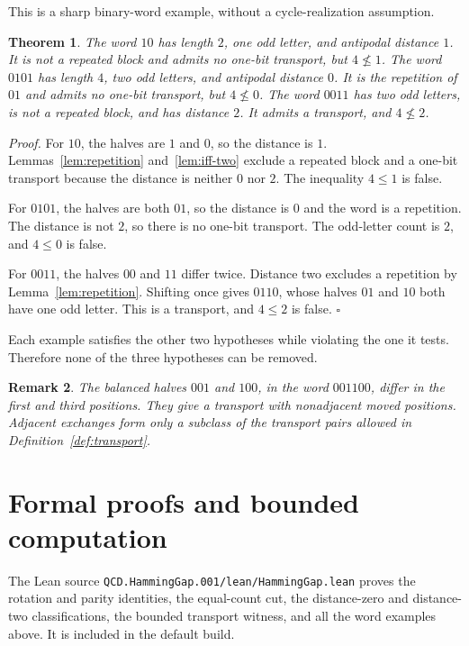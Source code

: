 \documentclass[11pt,letterpaper]{article}
\newtheorem{theorem}{Theorem}
\newtheorem{remark}[theorem]{Remark}
\newenvironment{proof}{\noindent\textit{Proof.}}{\hfill\(\square\)}
\begin{document}
This is a sharp binary-word example, without a cycle-realization assumption.

\begin{theorem}
\label{thm:necessary}
The word \(10\) has length \(2\), one odd letter, and antipodal distance \(1\).
It is not a repeated block and admits no one-bit transport, but \(4\not\le1\).
The word \(0101\) has length \(4\), two odd letters, and antipodal distance
\(0\). It is the repetition of \(01\) and admits no one-bit transport, but
\(4\not\le0\). The word \(0011\) has two odd letters, is not a repeated block,
and has distance \(2\). It admits a transport, and \(4\not\le2\).
\end{theorem}

\begin{proof}
For \(10\), the halves are \(1\) and \(0\), so the distance is \(1\). Lemmas~\ref{lem:repetition} and~\ref{lem:iff-two} exclude a repeated block and a one-bit transport because the distance is neither \(0\) nor \(2\). The inequality \(4\le 1\) is false.

For \(0101\), the halves are both \(01\), so the distance is \(0\) and the word
is a repetition. The distance is not \(2\), so there is no one-bit transport.
The odd-letter count is \(2\), and \(4\le0\) is false.

For \(0011\), the halves \(00\) and \(11\) differ twice. Distance two excludes
a repetition by Lemma~\ref{lem:repetition}. Shifting once gives \(0110\),
whose halves \(01\) and \(10\) both have one odd letter. This is a transport,
and \(4\le2\) is false.
\end{proof}

Each example satisfies the other two hypotheses while violating the one it
tests. Therefore none of the three hypotheses can be removed.

\begin{remark}
The balanced halves \(001\) and \(100\), in the word \(001100\), differ in the
first and third positions. They give a transport with nonadjacent moved
positions. Adjacent exchanges form only a subclass of the transport pairs
allowed in Definition~\ref{def:transport}.
\end{remark}

\section{Formal proofs and bounded computation}

The Lean source \texttt{QCD.HammingGap.001/lean/HammingGap.lean} proves the
rotation and parity identities, the equal-count cut, the distance-zero and
distance-two classifications, the bounded transport witness, and all the
word examples above. It is included in the default build.
\end{document}
